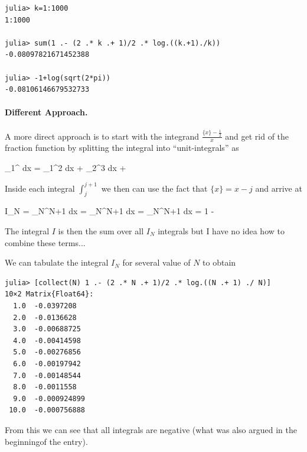 \begin{verbatim}
julia> k=1:1000
1:1000

julia> sum(1 .- (2 .* k .+ 1)/2 .* log.((k.+1)./k))
-0.08097821671452388

julia> -1+log(sqrt(2*pi))
-0.08106146679532733
\end{verbatim}

\paragraph{Different Approach.} A more direct approach is to start with the integrand $\frac{\{x\} - \frac{1}{2}}{x}$ and get rid of the fraction function by splitting the integral into ``unit-integrals'' as

\bee
\int_1^\infty {} dx = \int_1^2  dx + \int_2^3  dx + \cdots
\eee

Inside each integral $\int_j^{j+1}$ we then can use the fact that $\{ x \} = x-j$ and arrive at

\bee
I_N = \int_N^{N+1}  dx = \int_N^{N+1}  dx = \int_N^{N+1}  dx = 1 -  \log {}
\eee

The integral $I$ is then the sum over all $I_N$ integrals but I have no idea how to combine these terms...

We can tabulate the integral $I_N$ for several value of $N$ to obtain

\begin{verbatim}
julia> [collect(N) 1 .- (2 .* N .+ 1)/2 .* log.((N .+ 1) ./ N)]
10×2 Matrix{Float64}:
  1.0  -0.0397208
  2.0  -0.0136628
  3.0  -0.00688725
  4.0  -0.00414598
  5.0  -0.00276856
  6.0  -0.00197942
  7.0  -0.00148544
  8.0  -0.0011558
  9.0  -0.000924899
 10.0  -0.000756888
\end{verbatim}

From this we can see that all integrals are negative (what was also argued in the beginningof the entry). 


